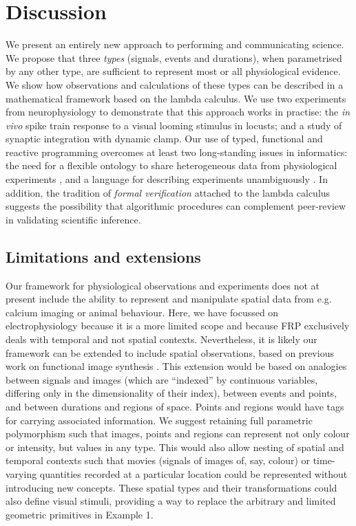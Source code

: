 \section*{Discussion}

We present an entirely new approach to performing and communicating
science. We propose that three \emph{types} (signals, events and
durations), when parametrised by any other type, are sufficient to
represent most or all physiological evidence. We show how observations
and calculations of these types can be described in a mathematical
framework based on the lambda calculus. We use two experiments from
neurophysiology to demonstrate that this approach works in practise:
the \emph{in vivo} spike train response to a visual looming stimulus
in locusts; and a study of synaptic integration with dynamic
clamp. Our use of typed, functional and reactive programming overcomes
at least two long-standing issues in informatics: the need for a
flexible ontology to share heterogeneous data from physiological
experiments \citep{Amari2002}, and a language for describing
experiments unambiguously \citep{Murray-Rust2002}. In addition, the
tradition of \emph{formal verification} attached to the lambda
calculus suggests the possibility that algorithmic procedures can
complement peer-review in validating scientific inference.

\subsection*{Limitations and extensions}

Our framework for physiological observations and experiments does not
at present include the ability to represent and manipulate spatial
data from e.g. calcium imaging or animal behaviour. Here, we have
focussed on electrophysiology because it is a more limited scope and
because FRP exclusively deals with temporal and not spatial
contexts. Nevertheless, it is likely our framework can be extended to
include spatial observations, based on previous work on functional
image synthesis \citep{Elliott2003}. This extension would be based on
analogies between signals and images (which are ``indexed'' by
continuous variables, differing only in the dimensionality of their
index), between events and points, and between durations and regions
of space. Points and regions would have tags for carrying associated
information. We suggest retaining full parametric polymorphism such
that images, points and regions can represent not only colour or
intensity, but values in any type. This would also allow nesting of
spatial and temporal contexts such that movies (signals of images of,
say, colour) or time-varying quantities recorded at a particular
location \citep[for instance spot calcium measurements as points of
signals of concentration;][]{DiGregorio1999} could be represented
without introducing new concepts. These spatial types and their
transformations could also define visual stimuli, providing a way to
replace the arbitrary and limited geometric primitives in Example 1.


